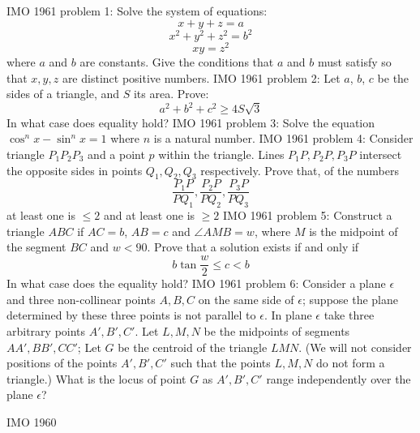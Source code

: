 IMO 1961 problem 1:  Solve the system of equations:
\[ x+y+z=a \]
\[ x^2+y^2+z^2=b^2 \]
\[ xy=z^2 \]
where $a$ and $b$ are constants. Give the conditions that $a$ and $b$ must satisfy so that $x,y,z$ are distinct positive numbers. 
IMO 1961 problem 2:  Let $ a$, $ b$, $ c$ be the sides of a triangle, and $ S$ its area. Prove:
\[ a^2 + b^2 + c^2\geq 4S \sqrt {3} \]
In what case does equality hold? 
IMO 1961 problem 3:  Solve the equation $\cos^n{x}-\sin^n{x}=1$ where $n$ is a natural number. 
IMO 1961 problem 4:  Consider triangle $P_1P_2P_3$ and a point $p$ within the triangle. Lines $P_1P, P_2P, P_3P$ intersect the opposite sides in points $Q_1, Q_2, Q_3$ respectively. Prove that, of the numbers
\[ \dfrac{P_1P}{PQ_1}, \dfrac{P_2P}{PQ_2}, \dfrac{P_3P}{PQ_3} \]
at least one is $\leq 2$ and at least one is $\geq 2$ 
IMO 1961 problem 5:  Construct a triangle $ABC$ if $AC=b$, $AB=c$ and $\angle AMB=w$, where $M$ is the midpoint of the segment $BC$ and $w<90$. Prove that a solution exists if and only if
\[ b \tan{\dfrac{w}{2}} \leq c <b \]
In what case does the equality hold? 
IMO 1961 problem 6:  Consider a plane $\epsilon$ and three non-collinear points $A,B,C$ on the same side of $\epsilon$; suppose the plane determined by these three points is not parallel to $\epsilon$. In plane $\epsilon$ take three arbitrary points $A',B',C'$. Let $L,M,N$ be the midpoints of segments $AA', BB', CC'$; Let $G$ be the centroid of the triangle $LMN$. (We will not consider positions of the points $A', B', C'$ such that the points $L,M,N$ do not form a triangle.) What is the locus of point $G$ as $A', B', C'$ range independently over the plane $\epsilon$? 

IMO 1960 

